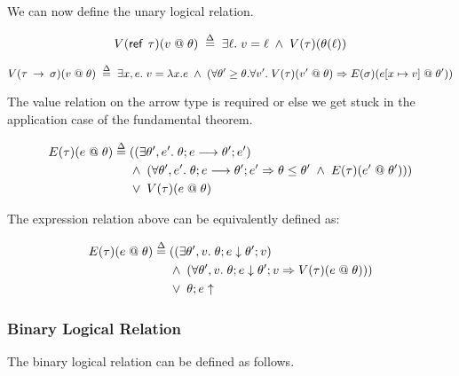 \documentclass{notes}
\begin{document}
We can now define the unary logical relation.

\begin{equation}
  \defas{
    \Vnew{\reftyp{\tau}}{v}{\theta}
  }{
    \exists \ell . \; v = \ell \; \land \; \Vold{\tau}{\theta(\ell)}
  }
\end{equation}

\begin{equation}
  \defas{
    \Vnew{\arrow{\tau}{\sigma}}{v}{\theta}
  }{
    \exists x, e . \; v = \lambda x . e \; \land \; (\forall \theta' \geq \theta . \forall v' . \; \Vnew{\tau}{v'}{\theta} \Rightarrow \Enew{\sigma}{e[x \mapsto v]}{\theta'})
  }
\end{equation}

\begin{nb}
  The value relation on the arrow type is required or else we get stuck in the application case of the fundamental theorem.
\end{nb}

\begin{equation}
  \begin{aligned}
    E(\tau)(e \; @ \; \theta) \overset{\Delta}{=} \; & ((\exists \theta' , e' . \; \theta; e \longrightarrow \theta'; e') \\
    & \land \; (\forall \theta', e' . \; \theta; e \longrightarrow \theta'; e' \Rightarrow \theta \leq \theta' \; \land \; E(\tau)(e' \; @ \; \theta'))) \\
    & \lor \; V(\tau)(e \; @ \; \theta)
  \end{aligned}
\end{equation}

The expression relation above can be equivalently defined as:

\begin{equation}
  \begin{aligned}
    E(\tau)(e \; @ \; \theta) \overset{\Delta}{=} \; & ((\exists \theta' , v . \; \theta; e \downarrow \theta'; v) \\
    & \land \; (\forall \theta', v . \; \theta; e \downarrow \theta'; v \Rightarrow V(\tau)(e \; @ \; \theta))) \\
    & \lor \; \theta;e \uparrow
  \end{aligned}
\end{equation}

\subsubsection{Binary Logical Relation}

The binary logical relation can be defined as follows.
\end{document}
